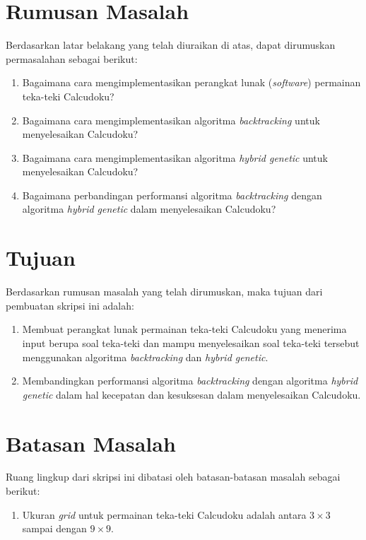 \section{Rumusan Masalah}
\label{sec:rumusan}
Berdasarkan latar belakang yang telah diuraikan di atas, dapat dirumuskan permasalahan sebagai berikut:
\begin{enumerate}
\item Bagaimana cara mengimplementasikan perangkat lunak (\textit{software}) permainan teka-teki Calcudoku?
\item Bagaimana cara mengimplementasikan algoritma \textit{backtracking} untuk menyelesaikan Calcudoku?
\item Bagaimana cara mengimplementasikan algoritma \textit{hybrid genetic} untuk menyelesaikan Calcudoku?
\item Bagaimana perbandingan performansi algoritma \textit{backtracking} dengan algoritma \textit{hybrid genetic} dalam menyelesaikan Calcudoku?
\end{enumerate}

\section{Tujuan}
\label{sec:tujuan}
Berdasarkan rumusan masalah yang telah dirumuskan, maka tujuan dari pembuatan skripsi ini adalah:
\begin{enumerate}
\item Membuat perangkat lunak permainan teka-teki Calcudoku yang menerima input berupa soal teka-teki dan mampu menyelesaikan soal teka-teki tersebut menggunakan algoritma \textit{backtracking} dan \textit{hybrid genetic}.
\item Membandingkan performansi algoritma \textit{backtracking} dengan algoritma \textit{hybrid genetic} dalam hal kecepatan dan kesuksesan dalam menyelesaikan Calcudoku.
\end{enumerate}

\section{Batasan Masalah}
\label{sec:batasan}
Ruang lingkup dari skripsi ini dibatasi oleh batasan-batasan masalah sebagai berikut:
\begin{enumerate}
\item Ukuran \textit{grid} untuk permainan teka-teki Calcudoku adalah antara \begin{math}3 \times 3\end{math} sampai dengan \begin{math}9 \times 9\end{math}.
\end{enumerate}

